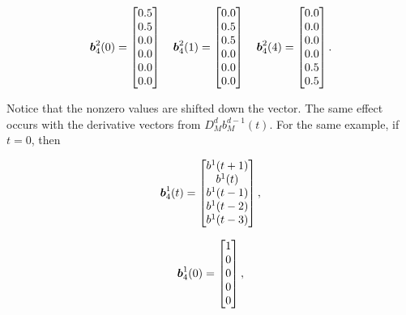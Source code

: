 \begin{align}
    \boldsymbol{b}_4^2(0) =
    \begin{bmatrix}
        0.5\\
        0.5\\
        0.0\\
        0.0\\
        0.0\\
        0.0\\
    \end{bmatrix}
    \quad
    \boldsymbol{b}_4^2(1) =
    \begin{bmatrix}
        0.0\\
        0.5\\
        0.5\\
        0.0\\
        0.0\\
        0.0\\
    \end{bmatrix}
    \quad
    \boldsymbol{b}_4^2(4) =
    \begin{bmatrix}
        0.0\\
        0.0\\
        0.0\\
        0.0\\
        0.5\\
        0.5\\
    \end{bmatrix}.
\end{align}

Notice that the nonzero values are shifted down the vector. 
The same effect occurs with the derivative vectors from $D_M^d b_M^{d-1}(t)$. For the same example, if $t=0$, then

\begin{align}
    \boldsymbol{b}^1_4(t) =
    \begin{bmatrix}
        b^1(t+1)\\
        b^1(t)\\
        b^1(t-1)\\
        b^1(t-2)\\
        b^1(t-3)\\        
    \end{bmatrix},
\end{align}


\begin{align}
    \boldsymbol{b}^1_4(0) =
    \begin{bmatrix}
        1\\
        0\\
        0\\
        0\\
        0\\
    \end{bmatrix},
\end{align}

